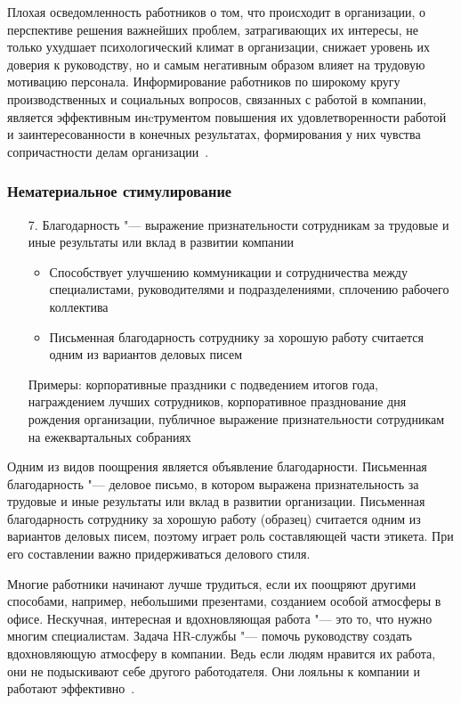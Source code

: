\documentclass{../industrial-development}
\begin{document}
		\lecturenotes
		
Плохая осведомленность работников о том, что происходит в организации, о перспективе решения важнейших проблем, затрагивающих их интересы, не только ухудшает психологический климат в организации, снижает уровень их доверия к руководству, но и самым негативным образом влияет на трудовую мотивацию персонала. Информирование работников по широкому кругу производственных и социальных вопросов, связанных с работой в компании, является эффективным инcтрументом повышения их удовлетворенности работой и заинтересованности в конечных результатах, формирования у них чувства сопричастности делам организации~\cite{VchemosobenIT}.


\begin{frame} \frametitle{Нематериальное стимулирование}
				  \begin{itemize}
					\item[7.] \alert{Благодарность} "--- выражение признательности сотрудникам за трудовые и иные результаты или вклад в развитии компании
\begin{itemize}
\item Способствует улучшению коммуникации и сотрудничества между специалистами, руководителями и подразделениями, сплочению рабочего коллектива
\item Письменная благодарность сотруднику за хорошую работу  считается одним из вариантов деловых писем
		  \end{itemize}
			Примеры: корпоративные праздники с подведением итогов года, награждением лучших сотрудников, корпоративное празднование дня рождения организации, публичное выражение признательности сотрудникам на ежеквартальных собраниях
					
  \end{itemize}

		\end{frame}
		
		\lecturenotes
		
Одним из видов поощрения является объявление благодарности. Письменная благодарность "--- деловое письмо, в котором выражена признательность за трудовые и иные результаты или вклад в развитии организации. Письменная благодарность сотруднику за хорошую работу (образец) считается одним из вариантов деловых писем, поэтому играет роль составляющей части этикета. При его составлении важно придерживаться делового стиля.

Многие работники начинают лучше трудиться, если их поощряют другими способами, например, небольшими презентами, созданием особой атмосферы в офисе. Нескучная, интересная и вдохновляющая работа "--- это то, что нужно многим специалистам. Задача HR-службы "--- помочь руководству создать вдохновляющую атмосферу в компании. Ведь если людям нравится их работа, они не подыскивают себе другого работодателя. Они лояльны к компании и работают эффективно~\cite{VchemosobenIT}.
\end{document}
